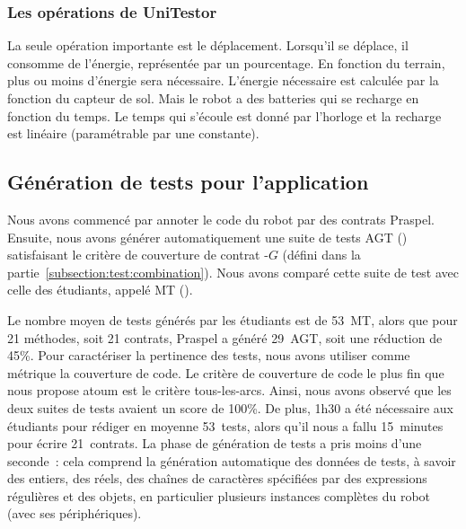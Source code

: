 \subsubsection{Les opérations de UniTestor}

La seule opération importante est le déplacement. Lorsqu'il se déplace, il
consomme de l'énergie, représentée par un pourcentage. En fonction du terrain,
plus ou moins d'énergie sera nécessaire. L'énergie nécessaire est calculée par
la fonction  du capteur de sol. Mais le robot a des
batteries qui se recharge en fonction du temps. Le temps qui s'écoule est donné
par l'horloge et la recharge est linéaire (paramétrable par une constante).

\subsection{Génération de tests pour l'application}

Nous avons commencé par annoter le code du robot par des contrats Praspel.
Ensuite, nous avons générer automatiquement une suite de tests AGT
() satisfaisant le critère de
couverture de contrat -$G$ (défini dans la
partie~\ref{subsection:test:combination}).  Nous avons comparé cette suite de
test avec celle des étudiants, appelé MT ().


Le nombre moyen de tests générés par les étudiants est de 53~MT, alors que pour
21 méthodes, soit 21 contrats, Praspel a généré 29~AGT, soit une réduction de
45\%. Pour caractériser la pertinence des tests, nous avons utiliser comme
métrique la couverture de code. Le critère de couverture de code le plus fin que
nous propose atoum est le critère tous-les-arcs. Ainsi, nous avons observé que
les deux suites de tests avaient un score de 100\%. De plus, 1h30 a été
nécessaire aux étudiants pour rédiger en moyenne 53~tests, alors qu'il nous a
fallu 15~minutes pour écrire 21~contrats.  La phase de génération de tests a
pris moins d'une seconde~: cela comprend la génération automatique des données
de tests, à savoir des entiers, des réels, des chaînes de caractères spécifiées
par des expressions régulières et des objets, en particulier plusieurs instances
complètes du robot (avec ses périphériques).

